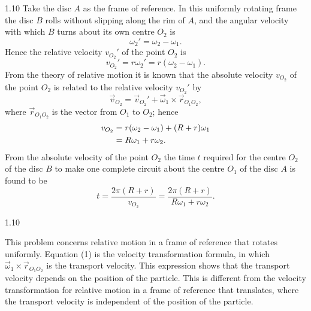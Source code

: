 \begin{solution}{1.10}
Take the disc $A$ as the frame of reference. In this uniformly rotating frame the disc $B$ rolls without slipping along the rim of $A$, and the angular velocity with which $B$ turns about its own centre $O_2$ is
\[
\omega_2'=\omega_2-\omega_1.
\]
Hence the relative velocity $v_{O_2}'$ of the point $O_2$ is
\[
v_{O_2}'=r\omega_2'=r(\omega_2-\omega_1).
\]
From the theory of relative motion it is known that the absolute velocity $v_{O_2}$ of the point $O_2$ is related to the relative velocity $v_{O_2}'$ by
\begin{equation}
\vec{v}_{O_2}=\vec{v}_{O_2}'+\vec{\omega}_1\times\vec{r}_{O_1O_2}, \tag{1}
\end{equation}
where $\vec{r}_{O_1O_2}$ is the vector from $O_1$ to $O_2$; hence
\begin{align}
v_{O_2}&=r(\omega_2-\omega_1)+(R+r)\omega_1\notag\\
&=R\omega_1+r\omega_2.\notag
\end{align}
From the absolute velocity of the point $O_2$ the time $t$ required for the centre $O_2$ of the disc $B$ to make one complete circuit about the centre $O_1$ of the disc $A$ is found to be
\[
t=\frac{2\pi(R+r)}{v_{O_2}}=\frac{2\pi(R+r)}{R\omega_1+r\omega_2}.
\]

\begin{figbox}{1.10}
\end{figbox}

\begin{commentary}
This problem concerns relative motion in a frame of reference that rotates uniformly. Equation (1) is the velocity transformation formula, in which $\vec{\omega}_1\times\vec{r}_{O_1O_2}$ is the transport velocity. This expression shows that the transport velocity depends on the position of the particle. This is different from the velocity transformation for relative motion in a frame of reference that translates, where the transport velocity is independent of the position of the particle.
\end{commentary}
\end{solution}

